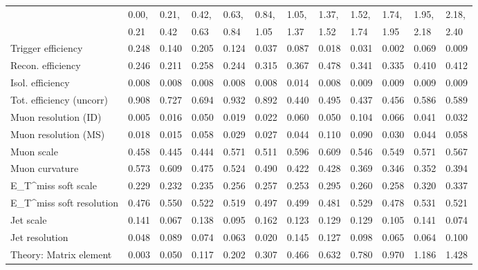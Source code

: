 \begin{tabular}{l|p{0.6cm}p{0.6cm}p{0.6cm}p{0.6cm}p{0.6cm}p{0.6cm}p{0.6cm}p{0.6cm}p{0.6cm}p{0.6cm}p{0.6cm}}
\hline
   & 0.00, & 0.21, & 0.42, & 0.63, & 0.84, & 1.05, & 1.37, & 1.52, & 1.74, & 1.95, & 2.18,  \\ 
   & 0.21 & 0.42 & 0.63 & 0.84 & 1.05 & 1.37 & 1.52 & 1.74 & 1.95 & 2.18 & 2.40  \\ 
\hline
Trigger efficiency                       & 0.248 & 0.140 & 0.205 & 0.124 & 0.037 & 0.087 & 0.018 & 0.031 & 0.002 & 0.069 & 0.009 \\
Recon. efficiency                        & 0.246 & 0.211 & 0.258 & 0.244 & 0.315 & 0.367 & 0.478 & 0.341 & 0.335 & 0.410 & 0.412 \\
Isol. efficiency                         & 0.008 & 0.008 & 0.008 & 0.008 & 0.008 & 0.014 & 0.008 & 0.009 & 0.009 & 0.009 & 0.009 \\
Tot. efficiency (uncorr)                 & 0.908 & 0.727 & 0.694 & 0.932 & 0.892 & 0.440 & 0.495 & 0.437 & 0.456 & 0.586 & 0.589 \\
Muon resolution (ID)                     & 0.005 & 0.016 & 0.050 & 0.019 & 0.022 & 0.060 & 0.050 & 0.104 & 0.066 & 0.041 & 0.032 \\
Muon resolution (MS)                     & 0.018 & 0.015 & 0.058 & 0.029 & 0.027 & 0.044 & 0.110 & 0.090 & 0.030 & 0.044 & 0.058 \\
Muon scale                               & 0.458 & 0.445 & 0.444 & 0.571 & 0.511 & 0.596 & 0.609 & 0.546 & 0.549 & 0.571 & 0.567 \\
Muon curvature                           & 0.573 & 0.609 & 0.475 & 0.524 & 0.490 & 0.422 & 0.428 & 0.369 & 0.346 & 0.352 & 0.394 \\
E_{T}^{miss} soft scale                  & 0.229 & 0.232 & 0.235 & 0.256 & 0.257 & 0.253 & 0.295 & 0.260 & 0.258 & 0.320 & 0.337 \\
E_{T}^{miss} soft resolution             & 0.476 & 0.550 & 0.522 & 0.519 & 0.497 & 0.499 & 0.481 & 0.529 & 0.478 & 0.531 & 0.521 \\
Jet scale                                & 0.141 & 0.067 & 0.138 & 0.095 & 0.162 & 0.123 & 0.129 & 0.129 & 0.105 & 0.141 & 0.074 \\
Jet resolution                           & 0.048 & 0.089 & 0.074 & 0.063 & 0.020 & 0.145 & 0.127 & 0.098 & 0.065 & 0.064 & 0.100 \\
Theory: Matrix element                   & 0.003 & 0.050 & 0.117 & 0.202 & 0.307 & 0.466 & 0.632 & 0.780 & 0.970 & 1.186 & 1.428 \\

\end{tabular}
